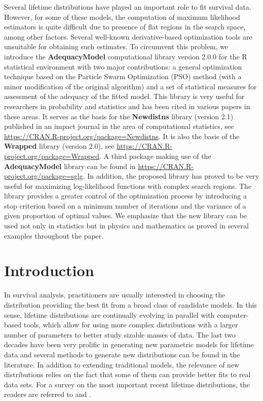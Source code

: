 \documentclass[10pt,letterpaper]{article}
\begin{document}
Several lifetime distributions have  played an important role to fit survival data. However, for some of these models,  the computation of maximum likelihood estimators is quite difficult due to presence of flat regions in the search space, among other factors. Several well-known derivative-based optimization tools are unsuitable for obtaining such estimates. To circumvent this problem, we introduce the \textbf{AdequacyModel} computational library version 2.0.0 for the \textsc{R} statistical environment with two major contributions: a general optimization technique based on the Particle Swarm Optimization (PSO) method (with a minor modification of the original algorithm) and a set of statistical measures for assessment of the adequacy of the fitted model. This library is very useful for researchers in pro\-bability and statistics and has been cited in various papers in these areas. It serves as the basis for the \textbf{Newdistns} library (version 2.1) published in an impact journal in the area of computational statistics, see \url{https://CRAN.R-project.org/package=Newdistns}. It is also the basis of the \textbf{Wrapped} library (version 2.0), see \url{https://CRAN.R-project.org/package=Wrapped}. A third package  making use of the \textbf{AdequacyModel} library can be found in \url{https://CRAN.R-project.org/package=sglg}. In addition, the proposed library has proved to be very useful for maximizing log-likelihood functions with complex search regions. The library provides a greater control of the optimization process by introducing a stop criterion  based on a minimum number of iterations and the variance of a given proportion of optimal values. We emphasize that the new library can be used not only in statistics but in physics and mathematics as proved in several examples throughout the paper.
\linenumbers

\section{Introduction}

In survival analysis, practitioners are usually interested in choosing the distribution  providing the best fit from a broad class of candidate models.
In this sense, lifetime distributions are continually evolving in parallel with computer-based tools, which allow for using more complex distributions
with a larger number of parameters to better study sizable masses of data.
The last two decades have been very prolific in generating new parametric models for lifetime data and several methods to generate new distributions can be found in the literature.
In addition to extending traditional models, the relevance of new distributions relies on the fact that some of them can provide better fits to real data sets.
For a survey on the most important recent lifetime distributions, the readers are referred to \cite{almalkinadarajah2014} and \cite{tahircordeiro2016}.
\end{document}

